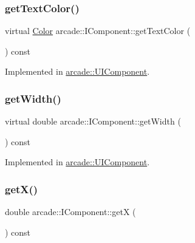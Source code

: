 \mbox{\label{classarcade_1_1_i_component_a9d4c57ad7c49e39ef0269f10fdc14807}} 
\subsubsection{\texorpdfstring{get\+Text\+Color()}{getTextColor()}}
{\footnotesize\ttfamily virtual \hyperlink{unionarcade_1_1_color}{Color} arcade\+::\+I\+Component\+::get\+Text\+Color (\begin{DoxyParamCaption}{ }\end{DoxyParamCaption}) const\hspace{0.3cm}{\ttfamily [pure virtual]}}



Implemented in \hyperlink{classarcade_1_1_u_i_component_a0a9e2a34357ad6759d580e152a20adee}{arcade\+::\+U\+I\+Component}.

\mbox{\label{classarcade_1_1_i_component_a558e5d49736a3828753a4062d5c9bfb1}} 
\subsubsection{\texorpdfstring{get\+Width()}{getWidth()}}
{\footnotesize\ttfamily virtual double arcade\+::\+I\+Component\+::get\+Width (\begin{DoxyParamCaption}{ }\end{DoxyParamCaption}) const\hspace{0.3cm}{\ttfamily [pure virtual]}}



Implemented in \hyperlink{classarcade_1_1_u_i_component_a56c4ce3124813be5d456aec399c63bc9}{arcade\+::\+U\+I\+Component}.

\mbox{\label{classarcade_1_1_i_component_ab9d24992e8519756d56c0282001eccce}} 
\subsubsection{\texorpdfstring{get\+X()}{getX()}}
{\footnotesize\ttfamily double arcade\+::\+I\+Component\+::getX (\begin{DoxyParamCaption}{ }\end{DoxyParamCaption}) const\hspace{0.3cm}{\ttfamily [pure virtual]}}



